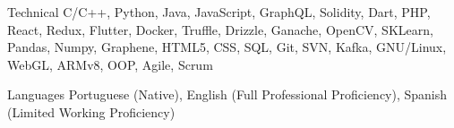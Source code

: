 
\begin{cvskills}
  \cvskill
    {Technical} %
    {C/C++, Python, Java, JavaScript, GraphQL, Solidity, Dart, PHP, React, Redux, Flutter, Docker, Truffle, Drizzle, Ganache, OpenCV, SKLearn, Pandas, Numpy, Graphene, HTML5, CSS, SQL, Git, SVN, Kafka, GNU/Linux, WebGL, ARMv8, OOP, Agile, Scrum} %

  \cvskill
    {Languages} %
    {Portuguese (Native), English (Full Professional Proficiency), Spanish (Limited Working Proficiency)} %

\end{cvskills}

